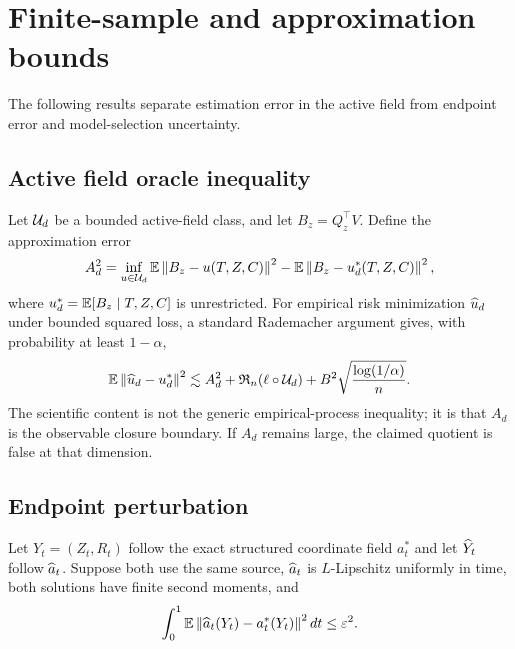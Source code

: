 \section{Finite-sample and approximation bounds}

The following results separate estimation error in the active field from endpoint error and model-selection uncertainty.

\subsection{Active field oracle inequality}

Let $\mathcal U_d$ be a bounded active-field class, and let $B_z=Q_z^\top V$.  Define the approximation error
\begin{equation}
 A_d^2=\inf_{u\in\mathcal U_d}\mathbb E\left\lVert B_z-u(T,Z,C)\right\rVert^2-\mathbb E\left\lVert B_z-u_d^*(T,Z,C)\right\rVert^2,
\end{equation}
where $u_d^*=\mathbb E[B_z\mid T,Z,C]$ is unrestricted.  For empirical risk minimization $\widehat u_d$ under bounded squared loss, a standard Rademacher argument gives, with probability at least $1-\alpha$,
\begin{equation}
 \mathbb E\left\lVert \widehat u_d-u_d^*\right\rVert^2
 \lesssim A_d^2+\mathfrak R_n(\ell\circ\mathcal U_d)+B^2\sqrt{\frac{\log(1/\alpha)}{n}}.
 \label{eq:oracle}
\end{equation}
The scientific content is not the generic empirical-process inequality; it is that $A_d$ is the observable closure boundary.  If $A_d$ remains large, the claimed quotient is false at that dimension.

\subsection{Endpoint perturbation}

Let $Y_t=(Z_t,R_t)$ follow the exact structured coordinate field $a_t^*$ and let $\widehat Y_t$ follow $\widehat a_t$.  Suppose both use the same source, $\widehat a_t$ is $L$-Lipschitz uniformly in time, both solutions have finite second moments, and
\begin{equation}
 \int_0^1\mathbb E\left\lVert \widehat a_t(Y_t)-a_t^*(Y_t)\right\rVert^2dt\le\varepsilon^2.
 \label{eq:field-error}
\end{equation}

